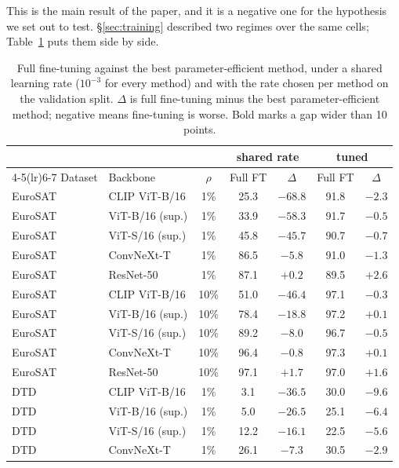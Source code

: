 \documentclass[preprint,12pt]{elsarticle}
\begin{document}
This is the main result of the paper, and it is a negative one for the hypothesis
we set out to test. \S\ref{sec:training} described two regimes over the same cells;
Table~\ref{tab:collapse} puts them side by side.

\begin{table}[t]
\centering
\caption{Full fine-tuning against the best parameter-efficient method, under a shared learning rate ($10^{-3}$ for every method) and with the rate chosen per method on the validation split. $\Delta$ is full fine-tuning minus the best parameter-efficient method; negative means fine-tuning is worse. Bold marks a gap wider than 10 points.}
\label{tab:collapse}
\small
\setlength{\tabcolsep}{3pt}
\begin{tabular}{llcc ccc}
\toprule
 & & & \multicolumn{2}{c}{shared rate} & \multicolumn{2}{c}{tuned} \\
\cmidrule(lr){4-5}\cmidrule(lr){6-7}
Dataset & Backbone & $\rho$ & Full FT & $\Delta$ & Full FT & $\Delta$ \\
\midrule
EuroSAT & CLIP ViT-B/16 & 1\% & 25.3 & $\mathbf{-68.8}$ & 91.8 & $-2.3$ \\
EuroSAT & ViT-B/16 (sup.) & 1\% & 33.9 & $\mathbf{-58.3}$ & 91.7 & $-0.5$ \\
EuroSAT & ViT-S/16 (sup.) & 1\% & 45.8 & $\mathbf{-45.7}$ & 90.7 & $-0.7$ \\
EuroSAT & ConvNeXt-T & 1\% & 86.5 & $-5.8$ & 91.0 & $-1.3$ \\
EuroSAT & ResNet-50 & 1\% & 87.1 & $+0.2$ & 89.5 & $+2.6$ \\
\midrule
EuroSAT & CLIP ViT-B/16 & 10\% & 51.0 & $\mathbf{-46.4}$ & 97.1 & $-0.3$ \\
EuroSAT & ViT-B/16 (sup.) & 10\% & 78.4 & $\mathbf{-18.8}$ & 97.2 & $+0.1$ \\
EuroSAT & ViT-S/16 (sup.) & 10\% & 89.2 & $-8.0$ & 96.7 & $-0.5$ \\
EuroSAT & ConvNeXt-T & 10\% & 96.4 & $-0.8$ & 97.3 & $+0.1$ \\
EuroSAT & ResNet-50 & 10\% & 97.1 & $+1.7$ & 97.0 & $+1.6$ \\
\midrule
DTD & CLIP ViT-B/16 & 1\% & 3.1 & $\mathbf{-36.5}$ & 30.0 & $-9.6$ \\
DTD & ViT-B/16 (sup.) & 1\% & 5.0 & $\mathbf{-26.5}$ & 25.1 & $-6.4$ \\
DTD & ViT-S/16 (sup.) & 1\% & 12.2 & $\mathbf{-16.1}$ & 22.5 & $-5.6$ \\
DTD & ConvNeXt-T & 1\% & 26.1 & $-7.3$ & 30.5 & $-2.9$ \\

\end{tabular}
\end{table}
\end{document}
